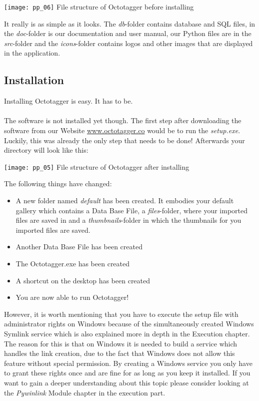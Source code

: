 \begin{center}
\texttt{[image: pp\_06]}
\small{File structure of Octotagger before installing}
\end{center}


It really is as simple as it looks. The \textit{db}-folder contains database and SQL files, in the \textit{doc}-folder is our documentation and user manual, our Python files are in the \textit{src}-folder and the \textit{icons}-folder contains logos and other images that are displayed in the application.

\subsection{Installation}
Installing Octotagger is easy. It has to be. 

\paragraph{}
The software is not installed yet though. The first step after downloading the software from our Website \href{"http://www.octotagger.co/"}{www.octotagger.co} would be to run the \textit{setup.exe}. Luckily, this was already the only step that needs to be done! Afterwards your directory will look like this:

\begin{center}
\texttt{[image: pp\_05]}
\small{File structure of Octotagger after installing}
\end{center}


The following things have changed:
\begin{itemize}
	\item A new folder named \textit{default} has been created. It embodies your default gallery which contains a Data Base File, a \textit{files}-folder, where your imported files are saved in and a \textit{thumbnails}-folder in which the thumbnails for you imported files are saved.
	\item Another Data Base File has been created
	\item The Octotagger.exe has been created
	\item A shortcut on the desktop has been created
	\item You are now able to run Octotagger!
\end{itemize}

However, it is worth mentioning that you have to execute the setup file with administrator rights on Windows because of the simultaneously created Windows Symlink service which is also explained more in depth in the Execution chapter. The reason for this is that on Windows it is needed to build a service which handles the link creation, due to the fact that Windows does not allow this feature without special permission. By creating a Windows service you only have to grant these rights once and are fine for as long as you keep it installed. If you want to gain a deeper understanding about this topic please consider looking at the \textit{Pywinlink} Module chapter in the execution part.

